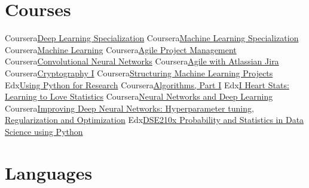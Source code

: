 \documentclass[11pt,a4paper,sans]{moderncv}        %
\begin{document}
\section{Courses}
\cvdoubleitem
{Coursera}{\href{https://www.coursera.org/account/accomplishments/specialization/certificate/Q3RT6P3BF5XU}{Deep Learning Specialization}}
{Coursera}{\href{https://www.coursera.org/account/accomplishments/specialization/YHKBDQ77K2GB}{Machine Learning Specialization}}
\cvdoubleitem
{Coursera}{\href{https://www.coursera.org/account/accomplishments/verify/CWFKK68KQP9X}{\small{Machine Learning}}}
{Coursera}{\href{https://www.coursera.org/api/legacyCertificates.v1/spark/statementOfAccomplishment/976353~15102768/pdf}{\small{Agile Project Management}}}
\cvdoubleitem
{Coursera}{\href{https://www.coursera.org/account/accomplishments/verify/5A8K3WTQHAZF}{\small{Convolutional Neural Networks}}}
{Coursera}{\href{https://www.coursera.org/account/accomplishments/certificate/ZTZR93WKX3JV}{\small{Agile with Atlassian Jira}}}
\cvdoubleitem
{Coursera}{\href{https://www.coursera.org/api/legacyCertificates.v1/spark/statementOfAccomplishment/976353~15102768/pdf}{\small{Cryptography I}}}
{Coursera}{\href{https://www.coursera.org/account/accomplishments/verify/BBTE8KJC6WRU}{\footnotesize{Structuring Machine Learning Projects}}}
\cvdoubleitem
{Edx}{\href{https://www.edx.org/course/using-python-for-research}{\small{Using Python for Research}}}
{Coursera}{\href{https://www.coursera.org/learn/algorithms-part1}{\small{Algorithms, Part I}}}
\cvdoubleitem
{Edx}{\href{https://www.edx.org/course/i-heart-stats-learning-love-statistics-notredamex-soc120x}{\scriptsize{I Heart Stats: Learning to Love Statistics}}}
{Coursera}{\href{https://www.coursera.org/account/accomplishments/verify/RY4DLN2Q6MW3}{\footnotesize{Neural Networks and Deep Learning}}}
\cvdoubleitem
{Coursera}{\href{https://www.coursera.org/account/accomplishments/verify/6SEWP83D96QM}{\scriptsize{Improving Deep Neural Networks: Hyperparameter tuning, Regularization and Optimization}}}
{Edx}{\href{https://www.edx.org/course/probability-and-statistics-in-data-science-using-python}{\scriptsize{DSE210x Probability and Statistics in Data Science using Python}}}

\section{Languages}
\end{document}
